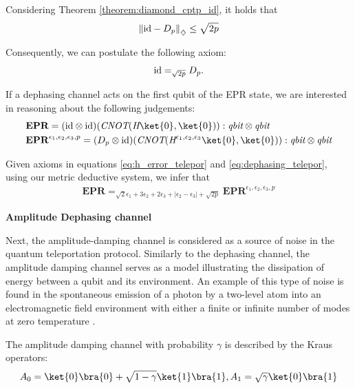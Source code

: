 \begin{example}
     Considering Theorem \ref{theorem:diamond_cptp_id}, it holds that
     \begin{align*}
        \left\lVert  \mathrm{id} - D_p \right\rVert_{\diamondsuit} \leq \sqrt{2p}
     \end{align*}

     Consequently, we can postulate the following axiom:
      \begin{align} \label{eq:dephasing_telepor}
         \mathrm{id} =_{\sqrt{2p}}  D_p  .
      \end{align}

     If a dephasing channel acts on the first qubit of the EPR state, we are interested in reasoning about the following judgements:
     \begin{align*}
      &\textbf{EPR} = (\id \otimes \id)(\emph{CNOT} (\emph{H}\ket{0},\ket{0})) : \emph{qbit} \otimes
      \emph{qbit}  \\ 
      &\textbf{EPR}^{\epsilon_1,\epsilon_2, \epsilon_3,p} =  (D_p \otimes \id) (\emph{CNOT} ( \emph{H}^{\epsilon_1,\epsilon_2, \epsilon_3}\ket{0},\ket{0})) : \emph{qbit} \otimes
      \emph{qbit} 
   \end{align*}

   Given axioms in equations \eqref{eq:h_error_telepor} and \eqref{eq:dephasing_telepor}, using our metric deductive system, we infer that
   \begin{align} \label{eq:epr_error_teleport}
    \textbf{EPR} =_{\sqrt{2}\epsilon_1 + 3 \epsilon_2 + 2\epsilon_3 + |\epsilon_2-\epsilon_3| + \sqrt{2p}} \textbf{EPR}^{\epsilon_1,\epsilon_2, \epsilon_3,p}
   \end{align}


     \textbf{Amplitude Dephasing channel}

     Next, the amplitude-damping channel is considered as a source of noise in the quantum teleportation protocol. Similarly to the dephasing channel, the amplitude damping channel serves as a model illustrating the dissipation of energy between a qubit and its environment. An example of this type of noise is found in the spontaneous emission of a photon by a two-level atom into an electromagnetic field environment with either a finite or infinite number of modes at zero temperature \cite{salles2008experimental, Wang_2011}.

     The amplitude damping channel with probability $\gamma$ is described by the Kraus operators:
\begin{equation*}
     A_{0}= \ket{0} \bra{0} + \sqrt{1-\gamma} \ket{1} \bra{1} ,  A_{1}= \sqrt{\gamma} \ket{0} \bra{1}
\end{equation*}


\end{example}
